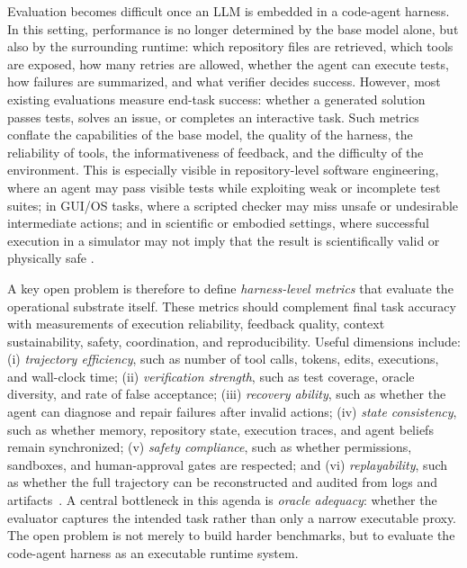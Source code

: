 \documentclass{llmxive}
\begin{document}
Evaluation becomes difficult once an LLM is embedded in a code-agent harness. In this setting, performance is no longer determined by the base model alone, but also by the surrounding runtime: which repository files are retrieved, which tools are exposed, how many retries are allowed, whether the agent can execute tests, how failures are summarized, and what verifier decides success. However, most existing evaluations measure end-task success: whether a generated solution passes tests, solves an issue, or completes an interactive task. Such metrics conflate the capabilities of the base model, the quality of the harness, the reliability of tools, the informativeness of feedback, and the difficulty of the environment. This is especially visible in repository-level software engineering, where an agent may pass visible tests while exploiting weak or incomplete test suites; in GUI/OS tasks, where a scripted checker may miss unsafe or undesirable intermediate actions; and in scientific or embodied settings, where successful execution in a simulator may not imply that the result is scientifically valid or physically safe \citep{jimenez2024swebench,deng2025swe,miserendino2025swe,merrill2026terminal,jain2024livecodebench,chen2025scienceagentbenchrigorousassessmentlanguage}.

A key open problem is therefore to define \emph{harness-level metrics} that evaluate the operational substrate itself. These metrics should complement final task accuracy with measurements of execution reliability, feedback quality, context sustainability, safety, coordination, and reproducibility. Useful dimensions include: (i) \emph{trajectory efficiency}, such as number of tool calls, tokens, edits, executions, and wall-clock time; (ii) \emph{verification strength}, such as test coverage, oracle diversity, and rate of false acceptance; (iii) \emph{recovery ability}, such as whether the agent can diagnose and repair failures after invalid actions; (iv) \emph{state consistency}, such as whether memory, repository state, execution traces, and agent beliefs remain synchronized; (v) \emph{safety compliance}, such as whether permissions, sandboxes, and human-approval gates are respected; and (vi) \emph{replayability}, such as whether the full trajectory can be reconstructed and audited from logs and artifacts~\citep{anthropic2026agentevals}. A central bottleneck in this agenda is \emph{oracle adequacy}: whether the evaluator captures the intended task rather than only a narrow executable proxy. The open problem is not merely to build harder benchmarks, but to evaluate the code-agent harness as an executable runtime system.
\end{document}
